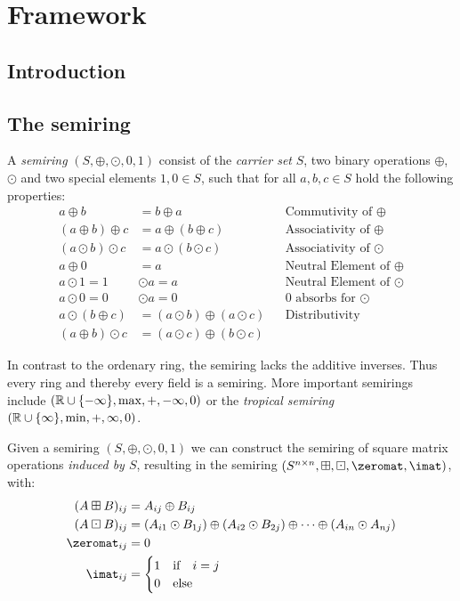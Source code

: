 \chapter{Framework}
\section{Introduction}

\section{The semiring}
\begin{definition}
    A \textit{semiring} $(S, \oplus, \odot, 0, 1)$ consist of the \textit{carrier set} $S$, two binary operations $\oplus$,$\odot$ and two special elements $1, 0 \in S$, such that for all $a, b, c \in S$ hold the following properties:
    \begin{align*}
        a \oplus b &= b \oplus a &&\textrm{Commutivity of $\oplus$}\\
        (a \oplus b) \oplus c &= a \oplus (b \oplus c) &&\textrm{Associativity of $\oplus$}\\
        (a \odot b) \odot c &= a \odot (b \odot c) &&\textrm{Associativity of $\odot$}\\
        a \oplus 0 &= a &&\textrm{Neutral Element of $\oplus$}\\
        a \odot 1 = 1 &\odot a = a &&\textrm{Neutral Element of $\odot$}\\
        a \odot 0 = 0 &\odot a = 0 &&\textrm{0 absorbs for $\odot$}\\
        a \odot (b \oplus c) &= (a \odot b) \oplus (a \odot c) &&\textrm{Distributivity}\\
        (a \oplus b) \odot c &= (a \odot c) \oplus (b \odot c)
    \end{align*}
\end{definition}

In contrast to the ordenary ring, the semiring lacks the additive inverses. Thus every ring and thereby every field is a semiring. More important semirings include $(\mathbb{R} \cup \{-\infty\}, \max, +, -\infty, 0)$ or the \textit{tropical semiring} $(\mathbb{R} \cup \{\infty\}, \min, +, \infty, 0)$.

\begin{definition}
    Given a semiring $(S, \oplus, \odot, 0, 1)$ we can construct the semiring of square matrix operations \textit{induced by $S$}, resulting in the semiring $(S^{n \times n}, \boxplus, \boxdot, \zeromat, \imat)$, with:
\begin{align*}
    (A \boxplus B)_{ij} &= A_{ij} \oplus B_{ij}\\
    (A \boxdot B)_{ij} &= (A_{i1} \odot B_{1j}) \oplus (A_{i2} \odot B_{2j}) \oplus \dots \oplus (A_{in} \odot A_{nj})\\
    \zeromat_{ij} &= 0\\
    \imat_{ij} &= \begin{cases}
        1 &\textrm{if}\quad i = j\\
        0 &\textrm{else}
    \end{cases}
\end{align*}
\end{definition}

